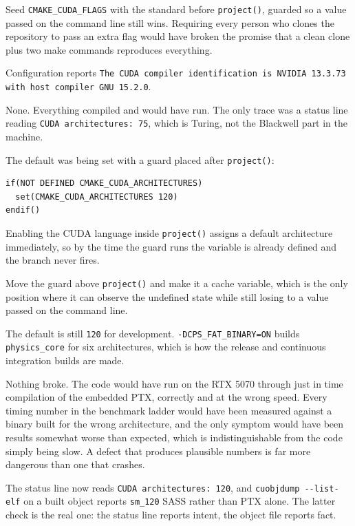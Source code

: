  Seed \texttt{CMAKE\_CUDA\_FLAGS} with the standard before
\texttt{project()}, guarded so a value passed on the command line still wins.
Requiring every person who clones the repository to pass an extra flag would
have broken the promise that a clean clone plus two make commands reproduces
everything.

 Configuration reports \texttt{The CUDA compiler
identification is NVIDIA 13.3.73 with host compiler GNU 15.2.0}.


 None. Everything compiled and would have run. The only trace
was a status line reading \texttt{CUDA architectures: 75}, which is Turing, not
the Blackwell part in the machine.

 The default was being set with a guard placed after
\texttt{project()}:

\begin{lstlisting}
if(NOT DEFINED CMAKE_CUDA_ARCHITECTURES)
  set(CMAKE_CUDA_ARCHITECTURES 120)
endif()
\end{lstlisting}

Enabling the CUDA language inside \texttt{project()} assigns a default
architecture immediately, so by the time the guard runs the variable is already
defined and the branch never fires.

 Move the guard above \texttt{project()} and make it a
cache variable, which is the only position where it can observe the undefined
state while still losing to a value passed on the command line.

The default is still \texttt{120} for development. \texttt{-DCPS\_FAT\_BINARY=ON} builds
\texttt{physics\_core} for six architectures, which is how the release and continuous
integration builds are made.

 Nothing broke.
The code would have run on the RTX 5070 through just in time compilation of the
embedded PTX, correctly and at the wrong speed. Every timing number in the
benchmark ladder would have been measured against a binary built for the wrong
architecture, and the only symptom would have been results somewhat worse than
expected, which is indistinguishable from the code simply being slow. A defect
that produces plausible numbers is far more dangerous than one that crashes.

 The status line now reads \texttt{CUDA architectures:
120}, and \verb|cuobjdump --list-elf| on a built object reports
\texttt{sm\_120} SASS rather than PTX alone. The latter check is the real one:
the status line reports intent, the object file reports fact.
